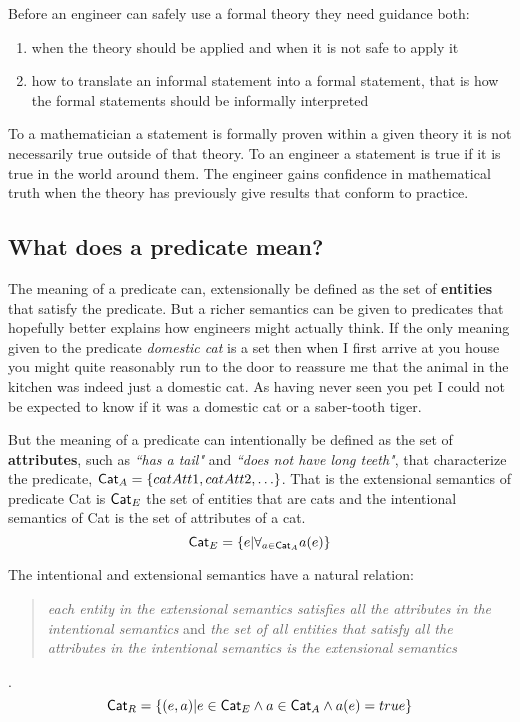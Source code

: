 Before an engineer can safely  use a formal theory  they need guidance both:
\begin{enumerate}
\item when the theory should be applied and when it is not safe to apply it
\item how to translate an informal statement into a formal statement, that is how the formal statements should be informally interpreted
\end{enumerate}

To a mathematician a statement is formally proven within a given theory it is not necessarily true outside of that theory. To an engineer a statement is true if it is true in the world around them. The engineer gains confidence in  mathematical truth when the theory has previously give results that conform to practice.


\subsection{What does a predicate mean?} \label{sec:Pred}

The meaning of a predicate can, extensionally  be defined as the set of {\bf entities} that satisfy the predicate. But a richer semantics can be given to predicates that hopefully better explains how engineers might actually think. If the only meaning given to the predicate \emph{domestic cat} is a set then when I first arrive at you house you might quite reasonably run to the door to reassure me that the animal in the kitchen was indeed just a domestic cat. As having never seen you pet I could not be expected to know if it was a domestic cat or a saber-tooth tiger.


But the meaning of a predicate can intentionally be defined as the set of {\bf attributes}, such as {\it ``has a tail"} and {\it ``does not have long teeth"}, that characterize the predicate, ${\sf Cat}_A = \{ catAtt1,catAtt2,\ldots\}$. That is the extensional semantics of predicate {\sf Cat} is $ {\sf Cat}_E$ the set of entities that are cats and the intentional semantics of {\sf Cat} is the set of attributes of a cat.
\[{\sf Cat}_E= \{ e | \forall_{ a\in {\sf Cat}_A } a(e) \} \]


The intentional and extensional semantics have a natural relation:
\begin{quotation} \emph{each entity in the extensional semantics satisfies all the  attributes in the intentional semantics} and \emph{the set of all entities that satisfy all the attributes in the  intentional semantics is the extensional semantics} \end{quotation}. 
\[{\sf Cat}_R = \{ (e,a)  | e\in {\sf Cat}_E \land a\in {\sf Cat}_A \land a(e)= true  \} \]


